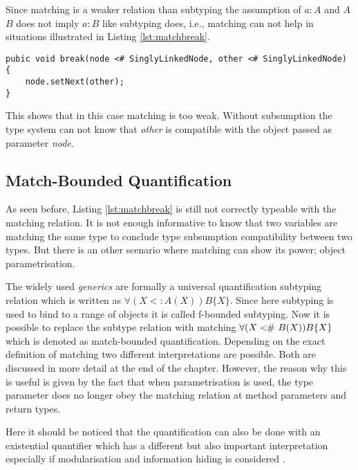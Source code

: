 Since matching is a weaker relation than subtyping the assumption of $a:A$
and $A$ \match $B$ does not imply $a:B$ like subtyping does, i.e., matching
can not help in situations illustrated in Listing \ref{lst:matchbreak}.

\begin{lstlisting}[float=ht,label={lst:matchbreak},caption={Matching relation in the break method}]
pubic void break(node <# SinglyLinkedNode, other <# SinglyLinkedNode) {
	node.setNext(other);
}
\end{lstlisting}

This shows that in this case matching is too weak. Without subsumption
the type system can not know that \emph{other} is compatible with the
object passed as parameter \emph{node}.

\subsection{Match-Bounded Quantification}
As seen before, Listing \ref{lst:matchbreak} is still not correctly
typeable with the matching relation. It is not enough informative to
know that two variables are matching the same type to conclude type
subsumption compatibility between two types. But there is an other
scenario where matching can show its power; object parametrisation.

The widely used \emph{generics} are formally a universal quantification
subtyping relation which is written as $\forall (X <: A(X))B\{X\}$. Since
here subtyping is used to bind \X to a range of objects it is
called f-bounded subtyping. Now it is possible to replace the
subtype relation with matching $\forall(X <\!\!\#~ B(X))B\{X\}$
which is denoted as match-bounded quantification. Depending on
the exact definition of matching two different interpretations are
possible\cite{abadi_subtyping_1996}. Both are discussed in more detail
at the end of the chapter. However, the reason why this is useful is given
by the fact that when parametrisation is used, the type parameter does no
longer obey the matching relation at method parameters and return types.

Here it should be noticed that the quantification can also be done with an
existential quantifier which has a different but also important
interpretation especially if modularisation and information hiding is
considered \cite{cameron_existential_2009,pierce_types_2002}.


